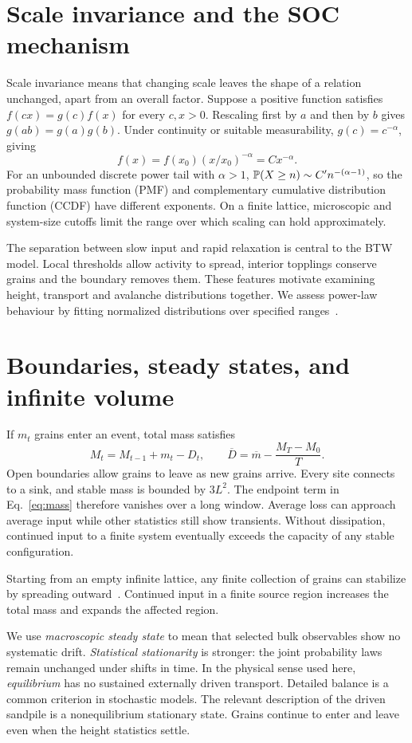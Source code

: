 \section{Scale invariance and the SOC mechanism}\label{sec:scaling}
Scale invariance means that changing scale leaves the shape of a relation unchanged, apart from an overall factor. Suppose a positive function satisfies $f(cx)=g(c)f(x)$ for every $c,x>0$. Rescaling first by $a$ and then by $b$ gives $g(ab)=g(a)g(b)$. Under continuity or suitable measurability, $g(c)=c^{-\alpha}$, giving
\begin{equation}
 f(x)=f(x_0)(x/x_0)^{-\alpha}=Cx^{-\alpha}.
\end{equation}
For an unbounded discrete power tail with $\alpha>1$, $\mathbb P(X\geq n)\sim C'n^{-(\alpha-1)}$, so the probability mass function (PMF) and complementary cumulative distribution function (CCDF) have different exponents. On a finite lattice, microscopic and system-size cutoffs limit the range over which scaling can hold approximately.

The separation between slow input and rapid relaxation is central to the BTW model. Local thresholds allow activity to spread, interior topplings conserve grains and the boundary removes them. These features motivate examining height, transport and avalanche distributions together. We assess power-law behaviour by fitting normalized distributions over specified ranges~\cite{clauset2009}.

\section{Boundaries, steady states, and infinite volume}\label{sec:boundaries}
If $m_t$ grains enter an event, total mass satisfies
\begin{equation}
 M_t=M_{t-1}+m_t-D_t,\qquad
 \overline D=\overline m-\frac{M_T-M_0}{T}.\label{eq:mass}
\end{equation}
Open boundaries allow grains to leave as new grains arrive. Every site connects to a sink, and stable mass is bounded by $3L^2$. The endpoint term in Eq.~\eqref{eq:mass} therefore vanishes over a long window. Average loss can approach average input while other statistics still show transients. Without dissipation, continued input to a finite system eventually exceeds the capacity of any stable configuration.

Starting from an empty infinite lattice, any finite collection of grains can stabilize by spreading outward~\cite{levinepropp2010}. Continued input in a finite source region increases the total mass and expands the affected region.

We use \emph{macroscopic steady state} to mean that selected bulk observables show no systematic drift. \emph{Statistical stationarity} is stronger: the joint probability laws remain unchanged under shifts in time. In the physical sense used here, \emph{equilibrium} has no sustained externally driven transport. Detailed balance is a common criterion in stochastic models. The relevant description of the driven sandpile is a nonequilibrium stationary state. Grains continue to enter and leave even when the height statistics settle.
